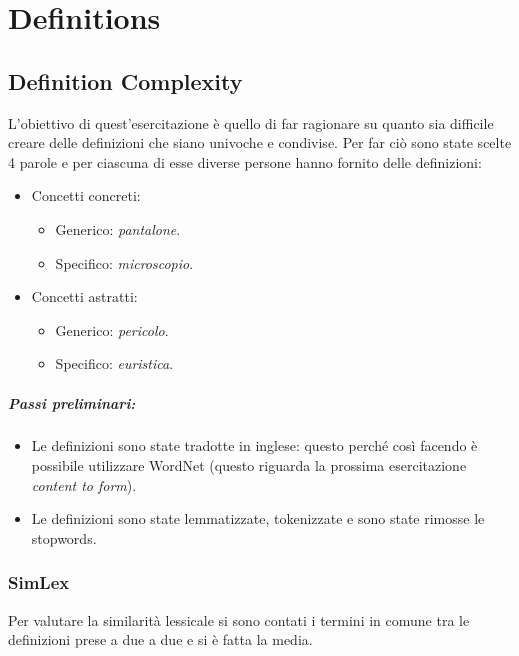 \chapter{Definitions}

\section{Definition Complexity}

L'obiettivo di quest'esercitazione è quello di far ragionare su quanto sia difficile creare delle definizioni che siano univoche e condivise. Per far ciò sono state scelte 4 parole e per ciascuna di esse diverse persone hanno fornito delle definizioni:

\begin{itemize}
  \item Concetti concreti:
    \begin{itemize}
      \item Generico: \textit{pantalone}. 
      \item Specifico: \textit{microscopio}. 
    \end{itemize}
  \item Concetti astratti:
    \begin{itemize}
      \item Generico: \textit{pericolo}. 
      \item Specifico: \textit{euristica}.
    \end{itemize}
\end{itemize}

\paragraph{Passi preliminari:}

\begin{itemize}
  \item Le definizioni sono state tradotte in inglese: questo perché così facendo è possibile utilizzare WordNet (questo riguarda la prossima esercitazione \textit{content to form}). 
  \item Le definizioni sono state lemmatizzate, tokenizzate e sono state rimosse le stopwords.
\end{itemize}

\subsection{SimLex}

Per valutare la similarità lessicale si sono contati i termini in comune tra le definizioni prese a due a due e si è fatta la media.

